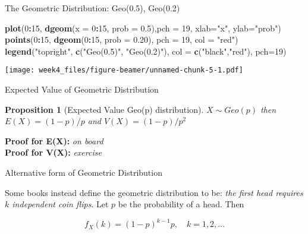 \documentclass[12pt,ignorenonframetext,compress]{beamer}
\newenvironment{Shaded}{\begin{snugshade}}{\end{snugshade}}
\newcommand{\KeywordTok}[1]{\textcolor[rgb]{0.13,0.29,0.53}{\textbf{#1}}}
\newcommand{\DataTypeTok}[1]{\textcolor[rgb]{0.13,0.29,0.53}{#1}}
\newcommand{\DecValTok}[1]{\textcolor[rgb]{0.00,0.00,0.81}{#1}}
\newcommand{\FloatTok}[1]{\textcolor[rgb]{0.00,0.00,0.81}{#1}}
\newcommand{\StringTok}[1]{\textcolor[rgb]{0.31,0.60,0.02}{#1}}
\newcommand{\OperatorTok}[1]{\textcolor[rgb]{0.81,0.36,0.00}{\textbf{#1}}}
\newcommand{\NormalTok}[1]{#1}
\let\oldShaded\Shaded
\let\endoldShaded\endShaded
\renewenvironment{Shaded}{\scriptsize\oldShaded}{\endoldShaded}
\newtheorem{proposition}[theorem]{Proposition}
\begin{document}
\begin{frame}[fragile]{The Geometric Distribution: Geo(0.5), Geo(0.2)}

\begin{Shaded}
\begin{Highlighting}[]
\KeywordTok{plot}\NormalTok{(}\DecValTok{0}\OperatorTok{:}\DecValTok{15}\NormalTok{, }\KeywordTok{dgeom}\NormalTok{(}\DataTypeTok{x =} \DecValTok{0}\OperatorTok{:}\DecValTok{15}\NormalTok{, }\DataTypeTok{prob =} \FloatTok{0.5}\NormalTok{),}\DataTypeTok{pch =} \DecValTok{19}\NormalTok{, }\DataTypeTok{xlab=}\StringTok{"x"}\NormalTok{, }\DataTypeTok{ylab=}\StringTok{"prob"}\NormalTok{)}
\KeywordTok{points}\NormalTok{(}\DecValTok{0}\OperatorTok{:}\DecValTok{15}\NormalTok{, }\KeywordTok{dgeom}\NormalTok{(}\DecValTok{0}\OperatorTok{:}\DecValTok{15}\NormalTok{, }\DataTypeTok{prob =} \FloatTok{0.20}\NormalTok{), }\DataTypeTok{pch =} \DecValTok{19}\NormalTok{, }\DataTypeTok{col =} \StringTok{"red"}\NormalTok{)}
\KeywordTok{legend}\NormalTok{(}\StringTok{"topright"}\NormalTok{, }\KeywordTok{c}\NormalTok{(}\StringTok{"Geo(0.5)"}\NormalTok{, }\StringTok{"Geo(0.2)"}\NormalTok{), }\DataTypeTok{col =} \KeywordTok{c}\NormalTok{(}\StringTok{"black"}\NormalTok{,}\StringTok{"red"}\NormalTok{), }\DataTypeTok{pch=}\DecValTok{19}\NormalTok{)}
\end{Highlighting}
\end{Shaded}

\texttt{[image: week4\_files/figure-beamer/unnamed-chunk-5-1.pdf]}

\end{frame}

\begin{frame}{Expected Value of Geometric Distribution}

\begin{proposition}[Expected Value Geo(p) distribution]
$X \sim Geo(p)$ then $E(X) = (1-p)/p$ and $V(X) = (1-p)/p^2$
\end{proposition}

\textbf{Proof for E(X):} \emph{on board}\\
\textbf{Proof for V(X):} \emph{exercise}

\end{frame}

\begin{frame}{Alternative form of Geometric Distribution}

Some books instead define the geometric distribution to be: \emph{the
first head requires \(k\) independent coin flips}. Let \(p\) be the
probability of a head. Then

\[f_X(k) = (1-p)^{k-1} p, \quad k = 1, 2, \ldots \]

\end{frame}
\end{document}
